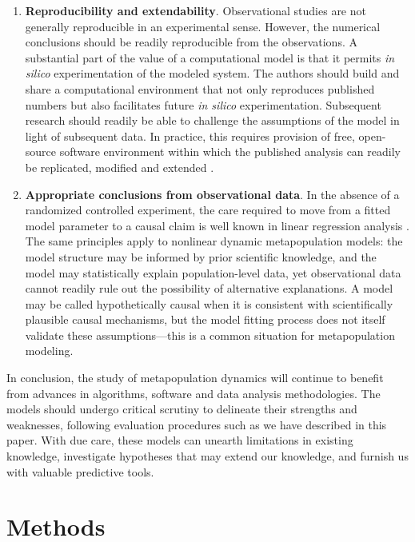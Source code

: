 \documentclass[12pt]{article}\usepackage[]{graphicx}\usepackage[]{xcolor}
\begin{document}
\begin{enumerate}
\item \label{point:viii} {\bf Reproducibility and extendability}.
Observational studies are not generally reproducible in an experimental sense.
However,  the numerical conclusions should be readily reproducible from the observations.
A substantial part of the value of a computational model is that it permits {\it in silico} experimentation of the modeled system.
The authors should build and share a computational environment that not only reproduces published numbers but also facilitates future {\it in silico} experimentation.
Subsequent research should readily be able to challenge the assumptions of the model in light of subsequent data.
In practice, this requires provision of free, open-source software environment within which the published analysis can readily be replicated, modified and extended \citep{gentleman07,wheeler23}. 

\item \label{point:ix} {\bf Appropriate conclusions from observational data}.
In the absence of a randomized controlled experiment, the care required to move from a fitted model parameter to a causal claim is well known in linear regression analysis \cite{faraway14}.
The same principles apply to nonlinear dynamic metapopulation models: the model structure may be informed by prior scientific knowledge, and the model may statistically explain population-level data, yet observational data cannot readily rule out the possibility of alternative explanations.
A model may be called hypothetically causal when it is consistent with scientifically plausible causal mechanisms, but the model fitting process does not itself validate these assumptions---this is a common situation for metapopulation modeling.

\end{enumerate}

In conclusion, the study of metapopulation dynamics will continue to benefit from advances in algorithms, software and data analysis methodologies.
The models should undergo critical scrutiny to delineate their strengths and weaknesses, following evaluation procedures such as we have described in this paper. 
With due care, these models can unearth limitations in existing knowledge, investigate hypotheses that may extend our knowledge, and furnish us with valuable predictive tools.

\section*{Methods}
\end{document}
